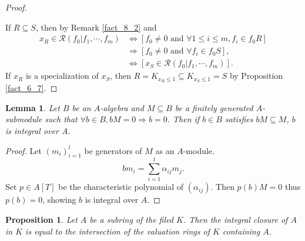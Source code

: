 \documentclass[8pt]{article}
\numberwithin{equation}{section}
\newtheorem{proposition}{Proposition}[subsection]
\newtheorem{lemma}{Lemma}[subsection]
\newcommand{\cR}[0]{\mathcal{R}}
\newcommand{\tand}[0]{\text{ and }}
\begin{document}
\begin{proof}$\:$
    \par If $R\subseteq S$, then by Remark \ref{fact_8_2} and
    \begin{align*}
        x_R\in\cR(f_0|f_1,\cdots,f_m) &\iff [f_0\not=0\tand \forall 1\leq i\leq m, f_i\in f_0R]\\
        &\Rightarrow [f_0\not=0\tand \forall f_i\in f_0S],\\
        &\iff [x_S\in\cR(f_0|f_1,\cdots,f_m)].
    \end{align*}
    If $x_R$ is a specialization of $x_S$, then $R = K_{x_R\leq 1}\subseteq K_{x_S\leq 1}=S$ by Proposition \ref{fact_6_7}.
\end{proof}


\begin{lemma}
    \label{lemma_8_aux}
    Let $B$ be an $A$-algebra and $M\subseteq B$ be a finitely generated $A$-submodule such that $\forall b\in B, bM=0\Rightarrow b=0$. Then if $b\in B$ satisfies $bM\subseteq M$, $b$ is integral over $A$.
\end{lemma}
\begin{proof}
    Let $(m_i)_{i=1}^l$ be generators of $M$ as an $A$-module. 
    \begin{equation*}
        bm_i = \sum_{i=1}^l \alpha_{ij}m_j.
    \end{equation*}
    Set $p\in A[T]$ be the characteristic polynomial of $(\alpha_{ij})$. Then $p(b)M = 0$ thus $p(b) = 0$, showing $b$ is integral over $A$. %
\end{proof}

\begin{proposition}
    \label{proposition_8_2}
    Let $A$ be a subring of the filed $K$. Then the integral closure of $A$ in $K$ is equal to the intersection of the valuation rings of $K$ containing $A$.
\end{proposition}
\end{document}
